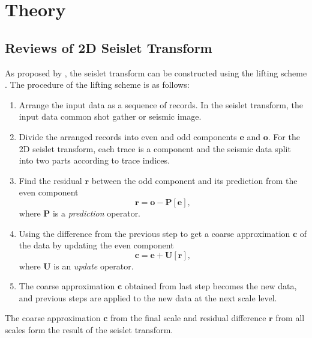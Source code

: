 \section{Theory}
\subsection{Reviews of 2D Seislet Transform}
    As proposed by \cite{Fomel2010a}, the seislet transform can be constructed 
    using the lifting scheme \cite[]{Sweldens1995}. 
    The procedure of the lifting scheme is as follows:
    \begin{enumerate}
        \item Arrange the input data as a sequence of records. 
            In the seislet transform, the input data  common shot gather or 
            seismic image.
        \item Divide the arranged records into even and odd components 
            $\mathbf{e}$ and $\mathbf{o}$. For the 2D seislet transform, each 
            trace is a component and the seismic data  split into two parts 
            according to trace indices.
        \item Find the residual $\mathbf{r}$ between the odd component and 
            its prediction from the even component
            \begin{equation}
                \mathbf{r} = \mathbf{o} - \mathbf{P[e]},
                \label{eq:a}
            \end{equation}
            where $\mathbf{P}$ is a \emph{prediction} operator.
        \item Using the difference from the previous step to get a coarse 
            approximation $\mathbf{c}$ of the data by updating the even 
            component
            \begin{equation}
                \mathbf{c} = \mathbf{e} + \mathbf{U[r]},
                \label{eq:b}
            \end{equation}
            where $\mathbf{U}$ is an \emph{update} operator.
        \item The coarse approximation $\mathbf{c}$ obtained from last step 
            becomes the new data, and previous steps are applied to the new data 
            at the next scale level.
    \end{enumerate}

    The coarse approximation $\mathbf{c}$ from the final scale and residual
    difference $\mathbf{r}$ from all scales form the result of the seislet 
    transform.

